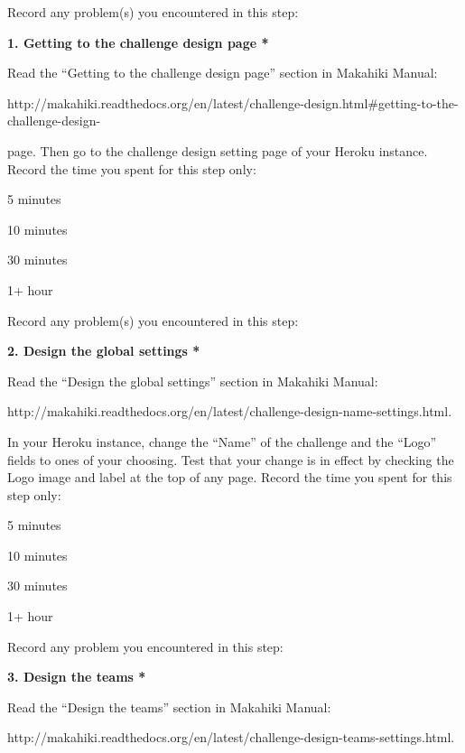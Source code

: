 Record any problem(s) you encountered in this step: \underline{\hspace{4cm}}

{\bf 1. Getting to the challenge design page *}

Read the ``Getting to the challenge design page'' section in Makahiki Manual:

http://makahiki.readthedocs.org/en/latest/challenge-design.html\#getting-to-the-challenge-design-

page. Then go to the challenge design setting page of your Heroku instance. Record the time you spent for this step only:

\begin{radiobutton}
\item 5 minutes
\item  10 minutes
\item  30 minutes
\item  1+ hour
\end{radiobutton}

Record any problem(s) you encountered in this step: \underline{\hspace{4cm}}

{\bf 2. Design the global settings *}

Read the ``Design the global settings'' section in Makahiki Manual:

http://makahiki.readthedocs.org/en/latest/challenge-design-name-settings.html. 

In your Heroku instance, change the ``Name'' of the challenge and the ``Logo'' fields to ones of your choosing. Test that your change is in effect by checking the Logo image and label at the top of any page. Record the time you spent for this step only:

\begin{radiobutton}
\item 5 minutes
\item  10 minutes
\item  30 minutes
\item  1+ hour
\end{radiobutton}


Record any problem you encountered in this step: \underline{\hspace{4cm}}

{\bf 3. Design the teams *}

Read the ``Design the teams'' section in Makahiki Manual:

http://makahiki.readthedocs.org/en/latest/challenge-design-teams-settings.html. 

